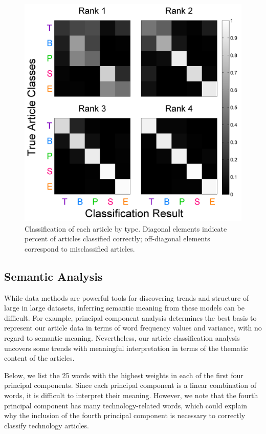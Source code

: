 \documentclass[12pt]{article}
\begin{document}
\begin{figure}[H]
\centering
\includegraphics[scale=.3]{figures/classificationmatrices}
\caption{Classification of each article by type. Diagonal elements indicate percent of articles classified correctly; off-diagonal
elements correspond to misclassified articles.}
\label{misclassification}
\end{figure}

\subsection{Semantic Analysis}

While data methods are powerful tools for discovering trends and structure of large in large datasets, inferring semantic meaning from these models can be difficult. For example, principal component analysis determines the best basis to represent our
article data in terms of word frequency values and variance, with no regard to semantic meaning. Nevertheless, our article classification analysis uncovers some trends with meaningful interpretation in terms of the thematic content of the articles.

Below, we list the 25 words with the highest weights in each of the first four principal components. Since each principal component is a linear combination of words, it is difficult to interpret their meaning. However, we note that the fourth principal
component has many technology-related words, which could explain why the inclusion of the fourth principal component is necessary to correctly classify technology articles.
\end{document}
